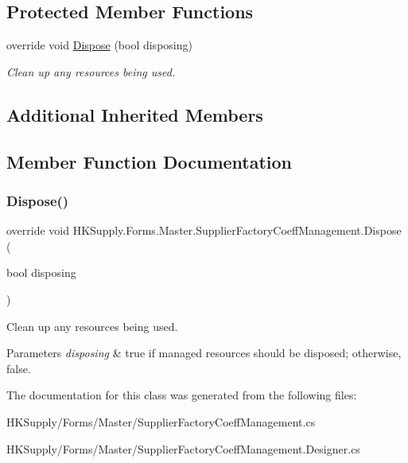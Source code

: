 \subsection*{Protected Member Functions}
\begin{DoxyCompactItemize}
\item 
override void \mbox{\hyperlink{class_h_k_supply_1_1_forms_1_1_master_1_1_supplier_factory_coeff_management_aacc56b0719bff753c147ae68f94064d8}{Dispose}} (bool disposing)
\begin{DoxyCompactList}\small\item\em Clean up any resources being used. \end{DoxyCompactList}\end{DoxyCompactItemize}
\subsection*{Additional Inherited Members}


\subsection{Member Function Documentation}
\mbox{\label{class_h_k_supply_1_1_forms_1_1_master_1_1_supplier_factory_coeff_management_aacc56b0719bff753c147ae68f94064d8}} 
\subsubsection{\texorpdfstring{Dispose()}{Dispose()}}
{\footnotesize\ttfamily override void H\+K\+Supply.\+Forms.\+Master.\+Supplier\+Factory\+Coeff\+Management.\+Dispose (\begin{DoxyParamCaption}\item[{bool}]{disposing }\end{DoxyParamCaption})\hspace{0.3cm}{\ttfamily [protected]}}



Clean up any resources being used. 


\begin{DoxyParams}{Parameters}
{\em disposing} & true if managed resources should be disposed; otherwise, false.\\
\hline
\end{DoxyParams}


The documentation for this class was generated from the following files\+:\begin{DoxyCompactItemize}
\item 
H\+K\+Supply/\+Forms/\+Master/Supplier\+Factory\+Coeff\+Management.\+cs\item 
H\+K\+Supply/\+Forms/\+Master/Supplier\+Factory\+Coeff\+Management.\+Designer.\+cs\end{DoxyCompactItemize}
